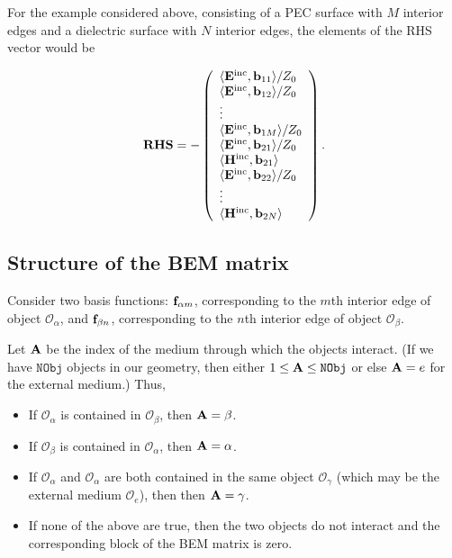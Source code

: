 \documentclass[letterpaper]{article}
\begin{document}
For the example considered above, consisting of a PEC surface
with $M$ interior edges and a dielectric surface with $N$ 
interior edges, the elements of the RHS vector would be 

\setlength{\extrarowheight}{3pt}
$$ \mathbf{RHS}=-\left(\begin{array}{l}
   \langle\mathbf{E}^{\hbox{\scriptsize{inc}}}, \mathbf{b}_{11} \rangle  / Z_0  
\\
   \langle\mathbf{E}^{\hbox{\scriptsize{inc}}}, \mathbf{b}_{12} \rangle  / Z_0 
\\
   \vdots 
\\
   \langle\mathbf{E}^{\hbox{\scriptsize{inc}}}, \mathbf{b}_{1M} \rangle  / Z_0 
\\
   \langle\mathbf{E}^{\hbox{\scriptsize{inc}}}, \mathbf{b}_{21} \rangle  / Z_0 
\\
   \langle\mathbf{H}^{\hbox{\scriptsize{inc}}}, \mathbf{b}_{21} \rangle 
\\
   \langle\mathbf{E}^{\hbox{\scriptsize{inc}}}, \mathbf{b}_{22} \rangle / Z_0 
\\
   \vdots
\\
   \langle\mathbf{H}^{\hbox{\scriptsize{inc}}}, \mathbf{b}_{2N} \rangle
   \end{array}\right).
$$

\subsection{Structure of the BEM matrix}

Consider two basis functions: $\mathbf{f}_{\alpha m}$, corresponding
to the $m$th interior edge of object $\mathcal{O}_\alpha$,
and $\mathbf{f}_{\beta n}$, corresponding to the $n$th interior edge
of object $\mathcal{O}_\beta.$ 

Let $\mathbf{A}$ be the index of the medium through which the 
objects interact. (If we have $\texttt{NObj}$ objects in 
our geometry, then either $1\le \mathbf{A} \le \texttt{NObj}$ 
or else $\mathbf{A}=e$ for the external medium.) Thus,

\begin{itemize}
 \item If $\mathcal{O}_\alpha$ is contained in $\mathcal{O}_\beta$, 
       then $\mathbf{A}=\beta$.
 \item If $\mathcal{O}_\beta$ is contained in $\mathcal{O}_\alpha$, 
       then $\mathbf{A}=\alpha$.
 \item If $\mathcal{O}_\alpha$ and $\mathcal{O}_\alpha$ are both
       contained in the same object $\mathcal{O}_\gamma$ (which may
       be the external medium $\mathcal{O}_e$), then  
       then $\mathbf{A}=\gamma$.
 \item If none of the above are true, then the two objects do not
       interact and the corresponding block of the BEM matrix is
       zero.
\end{itemize}
\end{document}
